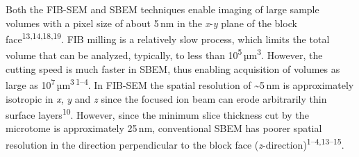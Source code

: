 \documentclass{article}
\newcommand{\cit}[1]{\textsuperscript{#1}}
\begin{document}
Both the FIB-SEM and SBEM techniques enable imaging of large sample volumes with a pixel size of about 5\,nm in the \emph{x}-\emph{y} plane of the block face\cit{13,14,18,19}. FIB milling is a relatively slow process, which limits the total volume that can be analyzed, typically, to less than 10\textsuperscript{5}\,µm\textsuperscript{3}. However, the cutting speed is much faster in SBEM, thus enabling acquisition of volumes as large as 10\textsuperscript{7}\,µm\textsuperscript{3}\,\cit{1–4}. In FIB-SEM the spatial resolution of \textasciitilde5\,nm is approximately isotropic in \emph{x}, \emph{y} and \emph{z} since the focused ion beam can erode arbitrarily thin surface layers\cit{10}. However, since the minimum slice thickness cut by the microtome is approximately 25\,nm, conventional SBEM has poorer spatial resolution in the direction perpendicular to the block face (\emph{z}-direction)\cit{1–4,13–15}.
\end{document}
